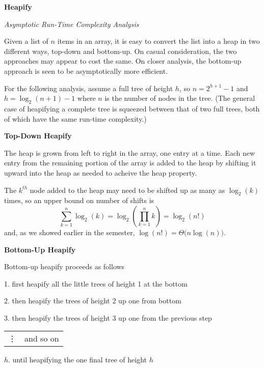 \documentclass{article}
\begin{document}
{\Large\bf Heapify}

{\large\it Asymptotic Run-Time Complexity Analysis}

\vspace{1pc}
Given a list of $n$ items in an array, it is easy to convert the list into a
heap in two different ways, top-down and bottom-up. On casual consideration,
the two approaches may appear to cost the same. On closer analysis, the
bottom-up approach is seen to be asymptotically more efficient.

\vspace{1pc}
For the following analysis,
assume a full tree of height $h$,
so $n=2^{h+1}-1$ and $h=\log_2(n+1) - 1$
where $n$ is the number of nodes in the tree.
(The general case of heapifying a complete tree is squeezed between that of two
full trees, both of which have the same run-time complexity.)

\vspace{1pc}
{\large\bf Top-Down Heapify}

\vspace{1pc}
The heap is grown from left to right in the array, one entry at a time.
Each new entry from the remaining portion of the array is added to the heap
by shifting it upward into the heap as needed to acheive the heap property.

\vspace{1pc}
The $k^{th}$ node added to the heap may need to be shifted up as many as
$\log_2(k)$ times, so an upper bound on number of shifts is
\[
  \sum_{k=1}^{n} \log_2(k)
=
  \log_2\left(\prod_{k=1}^{n} k\right)
=
  \log_2(n!)
\]
and, as we showed earlier in the semester, $\log(n!)=\Theta\big(n\log(n)\big)$.

\vspace{1pc}
{\large\bf Bottom-Up Heapify}

\vspace{1pc}
Bottom-up heapify proceeds as follows

\vspace{1pc}
1. first heapify all the little trees of height 1 at the bottom

2. then heapify the trees of height 2 up one from bottom

3. then heapify the trees of height 3 up one from the previous step

\begin{tabular}{ll}
\vdots & and so on \\
\end{tabular}

\vspace{0.5pc}
$h$. until heapifying the one final tree of height $h$
\end{document}
